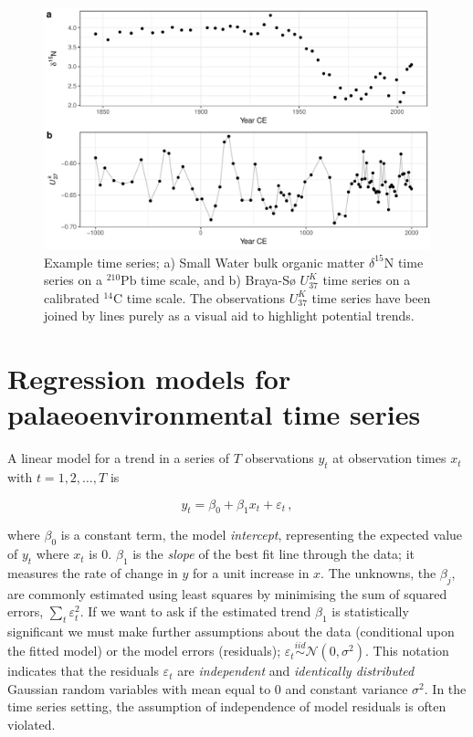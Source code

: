 \documentclass[12pt,]{article}
\newcommand{\uk}{\ensuremath{\mathit{U}^{\mathit{K}}_{\mathup{37}}}}
\begin{document}
\begin{figure}

{\centering \includegraphics[width=0.8\linewidth]{manuscript_files/figure-latex/data-figure-1} 

}

\caption{Example time series; a) Small Water bulk organic matter $\delta^{15}\text{N}$ time series on a ${}^{210}\text{Pb}$ time scale, and b) Braya-Sø \uk{} time series on a calibrated ${}^{14}\text{C}$ time scale. The observations \uk{} time series have been joined by lines purely as a visual aid to highlight potential trends.}\label{fig:data-figure}
\end{figure}

\section{Regression models for palaeoenvironmental time
series}\label{regression-models-for-palaeoenvironmental-time-series}

A linear model for a trend in a series of \(T\) observations \(y_t\) at
observation times \(x_t\) with \(t = 1, 2, \ldots, T\) is

\begin{equation} \label{eq:linear-model}
y_t = \beta_0 + \beta_1 x_t + \varepsilon_t \,,
\end{equation}

where \(\beta_0\) is a constant term, the model \emph{intercept},
representing the expected value of \(y_t\) where \(x_t\) is 0.
\(\beta_1\) is the \emph{slope} of the best fit line through the data;
it measures the rate of change in \(y\) for a unit increase in \(x\).
The unknowns, the \(\beta_j\), are commonly estimated using least
squares by minimising the sum of squared errors,
\(\sum_t \varepsilon_t^2\). If we want to ask if the estimated trend
\(\beta_1\) is statistically significant we must make further
assumptions about the data (conditional upon the fitted model) or the
model errors (residuals);
\(\varepsilon_t \stackrel{iid}{\sim} \mathcal{N}(0, \sigma^2)\). This
notation indicates that the residuals \(\varepsilon_t\) are
\emph{independent} and \emph{identically distributed} Gaussian random
variables with mean equal to \(0\) and constant variance \(\sigma^2\).
In the time series setting, the assumption of independence of model
residuals is often violated.
\end{document}
